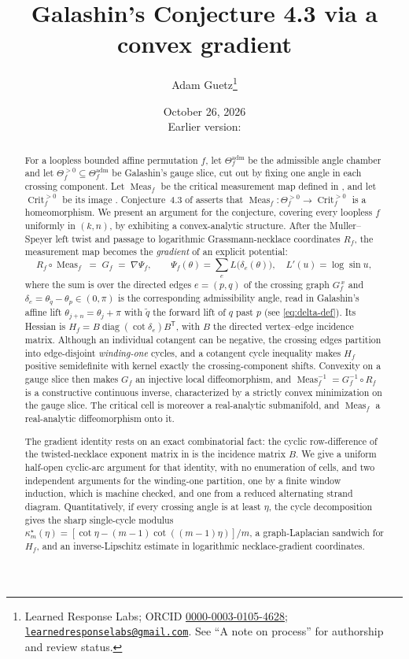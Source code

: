 \documentclass[11pt]{article}
\title{Galashin's Conjecture 4.3 via a convex gradient}
\author{Adam Guetz\thanks{Learned Response Labs; ORCID \href{https://orcid.org/0000-0003-0105-4628}{0000-0003-0105-4628};
\texttt{\href{mailto:learnedresponselabs@gmail.com}{learnedresponselabs@gmail.com}}. See ``A note on process''
for authorship and review status.}}
\date{October 26, 2026\\Earlier version: \PaperDOI}
\theoremstyle{definition}
\DeclareMathOperator{\Meas}{Meas}
\DeclareMathOperator{\Crit}{Crit}
\newcommand{\Thef}{\Theta_f^{>0}}
\newcommand{\Theadm}{\Theta_f^{\mathrm{adm}}}
\newcommand{\Critf}{\Crit_f^{>0}}
\begin{document}
\maketitle

\begin{abstract}
For a loopless bounded affine permutation $f$, let $\Theadm$ be the admissible angle chamber and let
$\Thef\subseteq\Theadm$ be Galashin's gauge slice, cut out by fixing one angle in each crossing
component. Let $\Meas_f$ be the critical measurement map defined in
\cite[Def.~1.15, eq.~(1.6)]{Galashin}, and let $\Critf$ be its image
\cite[Def.~1.8]{Galashin}. Conjecture~4.3 of \cite{Galashin} asserts that
$\Meas_f\colon\Thef\to\Critf$ is a homeomorphism. We present an argument for the conjecture,
covering every loopless $f$ uniformly in $(k,n)$, by exhibiting a
convex-analytic structure. After the Muller--Speyer left twist
\cite{MullerSpeyer} and passage to logarithmic Grassmann-necklace coordinates $R_f$, the measurement
map becomes the \emph{gradient} of an explicit potential:
\[
   R_f\circ\Meas_f \;=\; G_f \;=\; \nabla\Psi_f,\qquad
   \Psi_f(\theta)=\sum_{e}L\bigl(\delta_e(\theta)\bigr),\quad L'(u)=\log\sin u,
\]
where the sum is over the directed edges $e=(p,q)$ of the crossing graph $G_f^{\,x}$ and
$\delta_e=\theta_{\widetilde q}-\theta_p\in(0,\pi)$ is the corresponding admissibility angle, read in
Galashin's affine lift $\theta_{j+n}=\theta_j+\pi$ with $\widetilde q$ the forward lift of $q$ past $p$
(see \eqref{eq:delta-def}). Its Hessian is
$H_f=B\operatorname{diag}(\cot\delta_e)B^{\mathsf T}$, with $B$ the directed vertex--edge incidence
matrix. Although an individual cotangent can be negative, the crossing edges partition into
edge-disjoint \emph{winding-one} cycles, and a cotangent cycle inequality makes $H_f$ positive
semidefinite with kernel exactly the crossing-component shifts. Convexity on a gauge slice then makes
$G_f$ an injective local diffeomorphism, and $\Meas_f^{-1}=G_f^{-1}\circ R_f$ is a constructive
continuous inverse, characterized by a strictly convex minimization on the gauge slice. The critical cell
is moreover a real-analytic submanifold, and $\Meas_f$ a real-analytic diffeomorphism onto it.

The gradient identity rests on an exact combinatorial fact: the cyclic row-difference of the
twisted-necklace exponent matrix in \cite[Prop.~5.12]{Galashin} is the incidence matrix $B$. We give a
uniform half-open cyclic-arc argument for that identity, with no enumeration of cells, and two independent arguments for the
winding-one partition, one by a finite window induction, which is machine checked, and one from a reduced
alternating strand diagram. Quantitatively, if every crossing
angle is at least $\eta$, the cycle decomposition gives the sharp single-cycle modulus
$\kappa_m^\star(\eta)=[\cot\eta-(m-1)\cot((m-1)\eta)]/m$, a graph-Laplacian sandwich for $H_f$, and an
inverse-Lipschitz estimate in logarithmic necklace-gradient coordinates.


\end{abstract}
\end{document}
